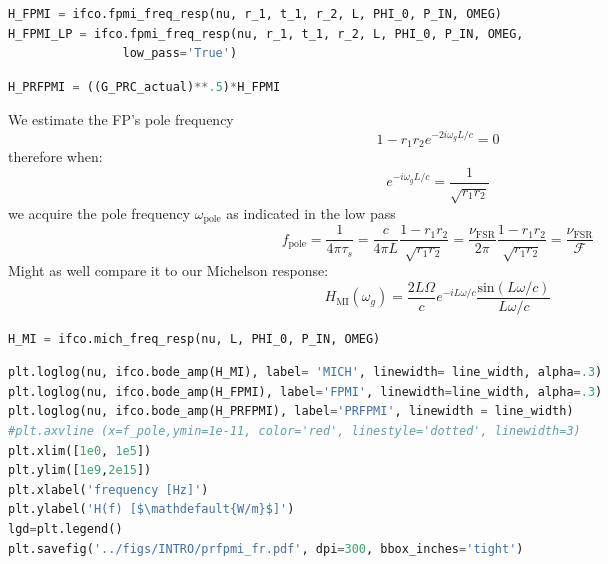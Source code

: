 \begin{spacing}{1.2}\begin{lstlisting}[frame=single, language=Python]
H_FPMI = ifco.fpmi_freq_resp(nu, r_1, t_1, r_2, L, PHI_0, P_IN, OMEG)
H_FPMI_LP = ifco.fpmi_freq_resp(nu, r_1, t_1, r_2, L, PHI_0, P_IN, OMEG, 
				low_pass='True')
\end{lstlisting}\end{spacing}

\begin{spacing}{1.2}\begin{lstlisting}[frame=single, language=Python]
H_PRFPMI = ((G_PRC_actual)**.5)*H_FPMI
\end{lstlisting}\end{spacing}

We estimate the FP's pole frequency
\begin{equation}  1 - r_1 r_2 e^{-2i \omega_g L / c} = 0 \end{equation} therefore when:
\begin{equation} e^{-i \omega_g L / c} = \frac{1}{\sqrt{r_1 r_2}} \end{equation} we acquire the
pole frequency \(\omega_\mathrm{pole}\) as indicated in the low pass
\begin{equation} f_\mathrm{pole} = \frac{1}{4\pi \tau_{s}} =  \frac{c}{4 \pi L} \frac{1- r_1 r_2}{\sqrt{r_1 r_2}} = \frac{\nu_\mathrm{FSR}}{2 \pi} \frac{1- r_1 r_2}{\sqrt{r_1 r_2}} = \frac{\nu_\mathrm{FSR}}{\mathcal{F}} \end{equation}Might
as well compare it to our Michelson response:
\begin{equation} H_{\mathrm{MI}}(\omega_g) = \frac{2 L \Omega}{c}e^{-i L \omega / c} \frac{\mathrm{sin}(L \omega /c)}{L \omega /c} \end{equation}

\begin{spacing}{1.2}\begin{lstlisting}[frame=single, language=Python]
H_MI = ifco.mich_freq_resp(nu, L, PHI_0, P_IN, OMEG)
\end{lstlisting}\end{spacing}

\begin{spacing}{1.2}\begin{lstlisting}[frame=single, language=Python]
plt.loglog(nu, ifco.bode_amp(H_MI), label= 'MICH', linewidth= line_width, alpha=.3)
plt.loglog(nu, ifco.bode_amp(H_FPMI), label='FPMI', linewidth=line_width, alpha=.3)
plt.loglog(nu, ifco.bode_amp(H_PRFPMI), label='PRFPMI', linewidth = line_width)
#plt.axvline (x=f_pole,ymin=1e-11, color='red', linestyle='dotted', linewidth=3)
plt.xlim([1e0, 1e5])
plt.ylim([1e9,2e15])
plt.xlabel('frequency [Hz]')
plt.ylabel('H(f) [$\mathdefault{W/m}$]')
lgd=plt.legend()
plt.savefig('../figs/INTRO/prfpmi_fr.pdf', dpi=300, bbox_inches='tight')
\end{lstlisting}\end{spacing}

